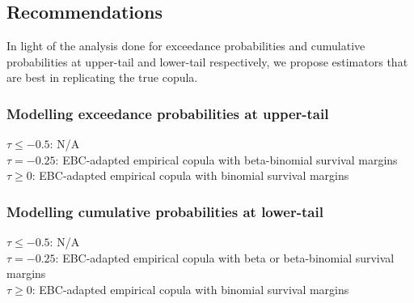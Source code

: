 \documentclass[12pt]{report}
\newcommand{\1}{\mathbf{1}}
\begin{document}
\begin{flushleft}
\newpage
\subsection{Recommendations}

In light of the analysis done for exceedance probabilities and cumulative probabilities at upper-tail and lower-tail respectively, we propose estimators that are best in replicating the true copula.

\subsubsection{Modelling exceedance probabilities at upper-tail}
$\tau \le -0.5$: N/A\\
$\tau = -0.25$: EBC-adapted empirical copula with beta-binomial survival margins \\
$\tau \ge 0$: EBC-adapted empirical copula with binomial survival margins

\subsubsection{Modelling cumulative probabilities at lower-tail}
$\tau \le -0.5$: N/A\\
$\tau = -0.25$: EBC-adapted empirical copula with beta or beta-binomial survival margins \\
$\tau \ge 0$: EBC-adapted empirical copula with binomial survival margins

\newpage

\end{flushleft}
\end{document}
